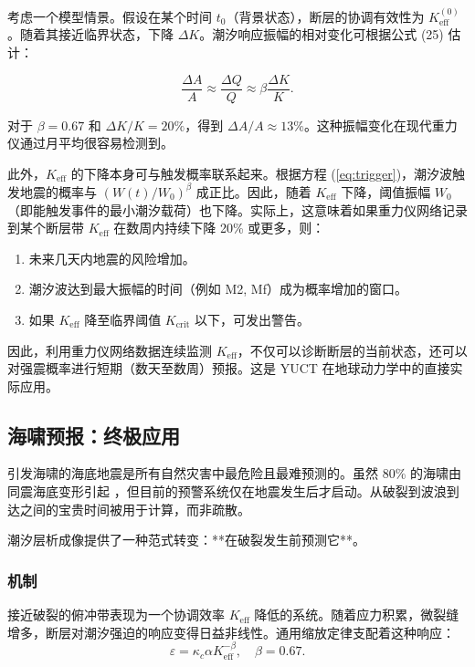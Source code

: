 \documentclass[12pt,a4paper]{article}
\theoremstyle{remark}
\begin{document}
	考虑一个模型情景。假设在某个时间 \(t_0\)（背景状态），断层的协调有效性为 \(K_{\mathrm{eff}}^{(0)}\)。随着其接近临界状态，下降 \(\Delta K\)。潮汐响应振幅的相对变化可根据公式 (25) 估计：
	
	\[
	\frac{\Delta A}{A} \approx \frac{\Delta Q}{Q} \approx \beta \frac{\Delta K}{K}.
	\]
	
	对于 \(\beta = 0.67\) 和 \(\Delta K/K = 20\%\)，得到 \(\Delta A/A \approx 13\%\)。这种振幅变化在现代重力仪通过月平均很容易检测到。
	
	此外，\(K_{\mathrm{eff}}\) 的下降本身可与触发概率联系起来。根据方程 (\ref{eq:trigger})，潮汐波触发地震的概率与 \((W(t)/W_0)^{\beta}\) 成正比。因此，随着 \(K_{\mathrm{eff}}\) 下降，阈值振幅 \(W_0\)（即能触发事件的最小潮汐载荷）也下降。实际上，这意味着如果重力仪网络记录到某个断层带 \(K_{\mathrm{eff}}\) 在数周内持续下降 20\% 或更多，则：
	
	\begin{enumerate}
		\item 未来几天内地震的风险增加。
		\item 潮汐波达到最大振幅的时间（例如 M2, Mf）成为概率增加的窗口。
		\item 如果 \(K_{\mathrm{eff}}\) 降至临界阈值 \(K_{\text{crit}}\) 以下，可发出警告。
	\end{enumerate}
	
	因此，利用重力仪网络数据连续监测 \(K_{\mathrm{eff}}\)，不仅可以诊断断层的当前状态，还可以对强震概率进行短期（数天至数周）预报。这是 YUCT 在地球动力学中的直接实际应用。
	
	\subsection{海啸预报：终极应用}
	\label{sec:tsunami}
	
	引发海啸的海底地震是所有自然灾害中最危险且最难预测的。虽然 80\% 的海啸由同震海底变形引起 \cite{NOAA2024, USGS2024}，但目前的预警系统仅在地震发生后才启动。从破裂到波浪到达之间的宝贵时间被用于计算，而非疏散。
	
	潮汐层析成像提供了一种范式转变：**在破裂发生前预测它**。
	
	\subsubsection{机制}
	
	接近破裂的俯冲带表现为一个协调效率 \(K_{\mathrm{eff}}\) 降低的系统。随着应力积累，微裂缝增多，断层对潮汐强迫的响应变得日益非线性。通用缩放定律支配着这种响应：
	\[
	\varepsilon = \kappa_c \alpha K_{\mathrm{eff}}^{-\beta}, \quad \beta = 0.67.
	\]
	
\end{document}
